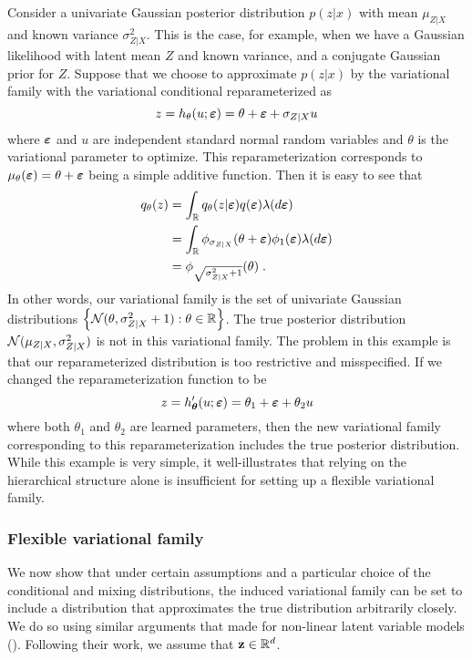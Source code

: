 \documentclass[10pt]{article}
\begin{document}
Consider a univariate Gaussian posterior distribution $p(z|x)$ with mean $\mu_{Z|X}$ and known variance $\sigma_{Z|X}^2$. This is the case, for example, when we have a Gaussian likelihood with latent mean $Z$ and known variance, and a conjugate Gaussian prior for $Z$. Suppose that we choose to approximate $p(z|x)$ by the \uivi variational family with the variational conditional reparameterized as
\[
z = h_\theta(u;\bm{\varepsilon}) = \theta + \bm{\varepsilon} + \sigma_{Z|X}u
\]
where $\bm{\varepsilon}$ and $u$ are independent standard normal random variables and $\theta$ is the variational parameter to optimize. This reparameterization corresponds to $\mu_\theta(\bm{\varepsilon})=\theta+\bm{\varepsilon}$ being a simple additive function. Then it is easy to see that
\begin{align*}
q_\theta(z) &= \int_{\mathbb{R}} q_\theta(z|\bm{\varepsilon})q(\bm{\varepsilon})\lambda(d\bm{\varepsilon}) \\
&= \int_{\mathbb{R}} \phi_{\sigma_{Z|X}}(\theta+\bm{\varepsilon})\phi_1(\bm{\varepsilon}) \lambda(d\bm{\varepsilon}) \\
&= \phi_{\sqrt{\sigma_{Z|X}^2+1}}(\theta) \;.
\end{align*}
In other words, our variational family is the set of univariate Gaussian distributions $\left\{\mathcal{N}(\theta,\sigma_{Z|X}^2+1):\theta\in\mathbb{R}\right\}$. The true posterior distribution $\mathcal{N}(\mu_{Z|X},\sigma_{Z|X}^2)$ is not in this variational family. The problem in this example is that our reparameterized distribution is too restrictive and misspecified. If we changed the reparameterization function to be
\[
z = h_{\bm{\theta}}'(u;\bm{\varepsilon}) = \theta_1 + \bm{\varepsilon} + \theta_2u
\]
where both $\theta_1$ and $\theta_2$ are learned parameters, then the new variational family corresponding to this reparameterization includes the true posterior distribution. While this example is very simple, it well-illustrates that relying on the hierarchical structure alone is insufficient for setting up a flexible variational family.


\subsubsection{Flexible variational family}

We now show that under certain assumptions and a particular choice of the conditional and mixing distributions, the induced \uivi variational family can be set to include a distribution that approximates the true distribution arbitrarily closely. We do so using similar arguments that \citet{Plummer:2021} made for non-linear latent variable models (\nllvm). Following their work, we assume that $\mathbf{z}\in\mathbb{R}^d$.
\\
\end{document}
